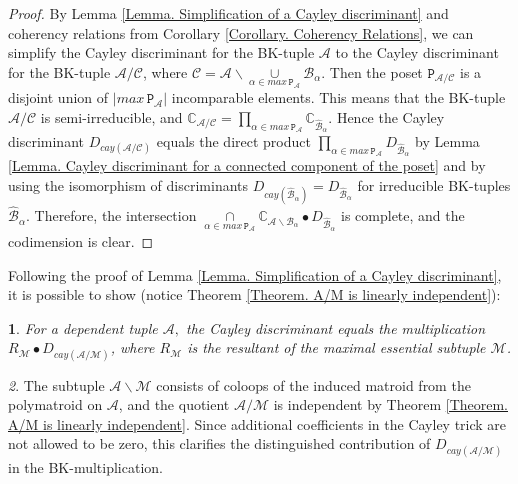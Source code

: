 \documentclass[11pt]{article}
\theoremstyle{plain}
\newtheorem{thm}{\protect\theoremname}[section]
\theoremstyle{definition}
\theoremstyle{remark}
\newtheorem{rem}[thm]{\protect\remarkname}
\theoremstyle{plain}
\theoremstyle{plain}
\theoremstyle{plain}
\theoremstyle{definition}
\providecommand{\remarkname}{Remark}
\providecommand{\theoremname}{Theorem}
\begin{document}
\begin{proof}
By Lemma \ref{Lemma. Simplification of a Cayley discriminant} and
coherency relations from Corollary \ref{Corollary. Coherency Relations},
we can simplify the Cayley discriminant for the BK-tuple $\mathscr{A}$
to the Cayley discriminant for the BK-tuple $\mathscr{A}/\mathscr{C}$,
where $\mathscr{C}=\mathscr{A}\backslash\underset{\alpha\in max\,\mathtt{P}_{\mathscr{A}}}{\cup}\mathscr{B}_{\alpha}$.
Then the poset $\mathtt{P}_{\mathscr{A}/\mathscr{C}}$ is a disjoint
union of $|max\,\mathtt{P}_{\mathscr{A}}|$ incomparable elements.
This means that the BK-tuple $\mathscr{A}/\mathscr{C}$ is semi-irreducible,
and $\mathbb{C}_{\mathscr{A}/\mathscr{C}}=\underset{\alpha\in max\,\mathtt{P}_{\mathscr{A}}}{\prod}\mathbb{C}_{\hat{\mathscr{B}}_{\alpha}}$.
Hence the Cayley discriminant $D_{cay(\mathscr{A}/\mathscr{C})}$
equals the direct product $\underset{\alpha\in max\,\mathtt{P}_{\mathscr{A}}}{\prod}D_{\hat{\mathscr{B}}_{\alpha}}$
by Lemma \ref{Lemma. Cayley discriminant for a connected component of the poset}
and by using the isomorphism of discriminants $D_{cay(\hat{\mathscr{B}}_{\alpha})}=D_{\hat{\mathscr{B}}_{\alpha}}$
for irreducible BK-tuples $\hat{\mathscr{B}}_{\alpha}$. Therefore,
the intersection $\underset{\alpha\in max\,\mathtt{P}_{\mathscr{A}}}{\cap}\mathbb{C}_{\mathscr{\mathscr{A}}\backslash\mathscr{B}_{\alpha}}\bullet D_{\hat{\mathscr{B}}_{\alpha}}$
is complete, and the codimension is clear.
\end{proof}
Following the proof of Lemma \ref{Lemma. Simplification of a Cayley discriminant},
it is possible to show (notice Theorem \ref{Theorem. A/M  is linearly independent}):
\begin{thm}
\label{Theorem. The Cayley discriminant for a linearly dependent tuple}For
a dependent tuple $\mathscr{A},$ the Cayley discriminant equals the
multiplication $R_{\mathscr{M}}\bullet D_{cay(\mathscr{A}/\mathscr{M})}$,
where $R_{\mathscr{M}}$ is the resultant of the maximal essential
subtuple $\mathscr{M}$.
\end{thm}

\begin{rem}
The subtuple $\mathscr{A}\backslash\mathscr{M}$ consists of coloops
of the induced matroid from the polymatroid on $\mathscr{A}$, and
the quotient $\mathscr{A}/\mathscr{M}$ is independent by Theorem
\ref{Theorem. A/M  is linearly independent}. Since additional coefficients
in the Cayley trick are not allowed to be zero, this clarifies the
distinguished contribution of $D_{cay(\mathscr{A}/\mathscr{M})}$
in the BK-multiplication. 
\end{rem}
\end{document}
